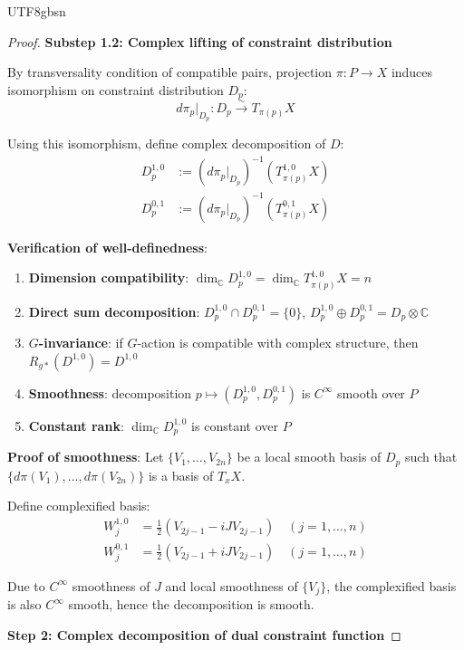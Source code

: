 \documentclass[a4paper,12pt]{extarticle}
\theoremstyle{definition}
\begin{document}
\begin{CJK}{UTF8}{gbsn}
\begin{proof}
\textbf{Substep 1.2: Complex lifting of constraint distribution}

By transversality condition of compatible pairs, projection $\pi: P \to X$ induces isomorphism on constraint distribution $D_p$:
\begin{equation}
d\pi_p|_{D_p}: D_p \stackrel{\sim}{\to} T_{\pi(p)}X
\end{equation}

Using this isomorphism, define complex decomposition of $D$:
\begin{align}
D^{1,0}_p &:= (d\pi_p|_{D_p})^{-1}(T^{1,0}_{\pi(p)}X) \\
D^{0,1}_p &:= (d\pi_p|_{D_p})^{-1}(T^{0,1}_{\pi(p)}X)
\end{align}

\textbf{Verification of well-definedness}:
\begin{enumerate}
    \item \textbf{Dimension compatibility}: $\dim_{\mathbb{C}} D^{1,0}_p = \dim_{\mathbb{C}} T^{1,0}_{\pi(p)}X = n$
    \item \textbf{Direct sum decomposition}: $D^{1,0}_p \cap D^{0,1}_p = \{0\}$, $D^{1,0}_p \oplus D^{0,1}_p = D_p \otimes \mathbb{C}$
    \item \textbf{$G$-invariance}: if $G$-action is compatible with complex structure, then $R_{g*}(D^{1,0}) = D^{1,0}$
    \item \textbf{Smoothness}: decomposition $p \mapsto (D^{1,0}_p, D^{0,1}_p)$ is $C^\infty$ smooth over $P$
    \item \textbf{Constant rank}: $\dim_{\mathbb{C}} D^{1,0}_p$ is constant over $P$
\end{enumerate}

\textbf{Proof of smoothness}:
Let $\{V_1, \ldots, V_{2n}\}$ be a local smooth basis of $D_p$ such that $\{d\pi(V_1), \ldots, d\pi(V_{2n})\}$ is a basis of $T_xX$.

Define complexified basis:
\begin{align}
W_j^{1,0} &= \frac{1}{2}(V_{2j-1} - iJV_{2j-1}) \quad (j = 1, \ldots, n) \\
W_j^{0,1} &= \frac{1}{2}(V_{2j-1} + iJV_{2j-1}) \quad (j = 1, \ldots, n)
\end{align}

Due to $C^\infty$ smoothness of $J$ and local smoothness of $\{V_j\}$, the complexified basis is also $C^\infty$ smooth, hence the decomposition is smooth.

\textbf{Step 2: Complex decomposition of dual constraint function}


\end{proof}
\end{CJK}
\end{document}
